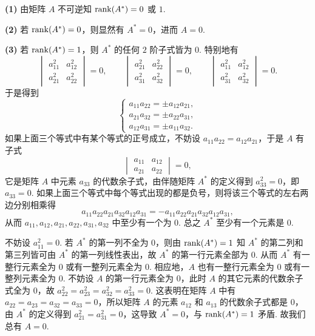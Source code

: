 \begin{solution}
\textbf{(1)} 由矩阵 $A$ 不可逆知 $\operatorname{rank}(A^*)=0$ 或 $1$.

\textbf{(2)} 若 $\operatorname{rank}(A^*)=0$，则显然有 $A^*=0$，进而 $A=0$.

\textbf{(3)} 若 $\operatorname{rank}(A^*)=1$，则 $A^*$ 的任何 $2$ 阶子式皆为 $0$. 特别地有
\[
  \begin{vmatrix}
    a_{11}^2 & a_{12}^2\\
    a_{21}^2 & a_{22}^2
  \end{vmatrix}=0,\qquad
  \begin{vmatrix}
    a_{21}^2 & a_{22}^2\\
    a_{31}^2 & a_{32}^2
  \end{vmatrix}=0,\qquad
  \begin{vmatrix}
    a_{11}^2 & a_{12}^2\\
    a_{31}^2 & a_{32}^2
  \end{vmatrix}=0.
\]
于是得到
\[
  \begin{cases}
    a_{11}a_{22}=\pm a_{12}a_{21},\\
    a_{21}a_{32}=\pm a_{22}a_{31},\\
    a_{12}a_{31}=\pm a_{11}a_{32}.
  \end{cases}
\]
如果上面三个等式中有某个等式的正号成立，不妨设 $a_{11}a_{22}=a_{12}a_{21}$，于是 $A$ 有子式
\[
  \begin{vmatrix}
    a_{11} & a_{12}\\
    a_{21} & a_{22}
  \end{vmatrix}=0,
\]
它是矩阵 $A$ 中元素 $a_{33}$ 的代数余子式，由伴随矩阵 $A^*$ 的定义得到 $a_{33}^2=0$，即 $a_{33}=0$. 如果上面三个等式中每个等式出现的都是负号，则将该三个等式的左右两边分别相乘得
\[
  a_{11}a_{22}a_{21}a_{32}a_{12}a_{31}=-a_{11}a_{22}a_{21}a_{32}a_{12}a_{31},
\]
从而 $a_{11},a_{12},a_{21},a_{22},a_{31},a_{32}$ 中至少有一个为 $0$. 总之 $A^*$ 至少有一个元素是 $0$.

不妨设 $a_{11}^2=0$. 若 $A^*$ 的第一列不全为 $0$，则由 $\operatorname{rank}(A^*)=1$ 知 $A^*$ 的第二列和第三列皆可由 $A^*$ 的第一列线性表出，故 $A^*$ 的第一行元素全部为 $0$. 从而 $A^*$ 有一整行元素全为 $0$ 或有一整列元素全为 $0$. 相应地，$A$ 也有一整行元素全为 $0$ 或有一整列元素全为 $0$. 不妨设 $A$ 的第一行元素全为 $0$，此时 $A$ 的其它元素的代数余子式全为 $0$，故 $a_{22}^2=a_{23}^2=a_{32}^2=a_{33}^2=0$. 这表明在矩阵 $A$ 中有 $a_{22}=a_{23}=a_{32}=a_{33}=0$，所以矩阵 $A$ 的元素 $a_{12}$ 和 $a_{13}$ 的代数余子式都是 $0$，由 $A^*$ 的定义得到 $a_{21}^2=a_{31}^2=0$，这导致 $A^*=0$，与 $\operatorname{rank}(A^*)=1$ 矛盾. 故我们总有 $A=0$.
\end{solution}

